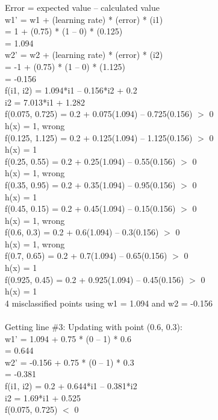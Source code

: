 \documentclass{article}
\begin{document}
Error = expected value – calculated value
\\
w1’ = w1 + (learning rate) * (error) * (i1)
\\
	= 1 + (0.75) * (1 – 0) * (0.125)
\\
	= 1.094
\\
w2’ = w2 + (learning rate) * (error) * (i2)
\\
	= -1 + (0.75) * (1 – 0) * (1.125)
\\
	= -0.156
\\
f(i1, i2) = 1.094*i1 – 0.156*i2 + 0.2
\\
i2 = 7.013*i1 + 1.282
\\
f(0.075, 0.725) = 0.2 + 0.075(1.094) – 0.725(0.156) $>$ 0	
\\	
h(x) = 1, wrong
\\
f(0.125, 1.125) = 0.2 + 0.125(1.094) – 1.125(0.156) $>$ 0	
\\	
h(x) = 1
\\
f(0.25, 0.55) = 0.2 + 0.25(1.094) – 0.55(0.156) $>$ 0	
\\	
h(x) = 1, wrong
\\
f(0.35, 0.95) = 0.2 + 0.35(1.094) – 0.95(0.156) $>$ 0
\\		
h(x) = 1
\\
f(0.45, 0.15) = 0.2 + 0.45(1.094) – 0.15(0.156) $>$ 0	
\\	
h(x) = 1, wrong
\\
f(0.6, 0.3) = 0.2 + 0.6(1.094) – 0.3(0.156) $>$ 0	
\\		
h(x) = 1, wrong
\\
f(0.7, 0.65) = 0.2 + 0.7(1.094) – 0.65(0.156) $>$ 0	
\\		
h(x) = 1
\\
f(0.925, 0.45) = 0.2 + 0.925(1.094) – 0.45(0.156) $>$ 0		
\\
h(x) = 1
\\
4 misclassified points using w1 = 1.094 and w2 = -0.156
\\
\\
{\LARGE Getting line \#3:}
Updating with point (0.6, 0.3):
\\
w1’ = 1.094 + 0.75 * (0 – 1) * 0.6
\\
	= 0.644
\\
w2’ = -0.156 + 0.75 * (0 – 1) * 0.3
\\
	= -0.381
\\
f(i1, i2) = 0.2 + 0.644*i1 – 0.381*i2
\\
i2 = 1.69*i1 + 0.525
\\
f(0.075, 0.725) $<$ 0
\\
\end{document}
